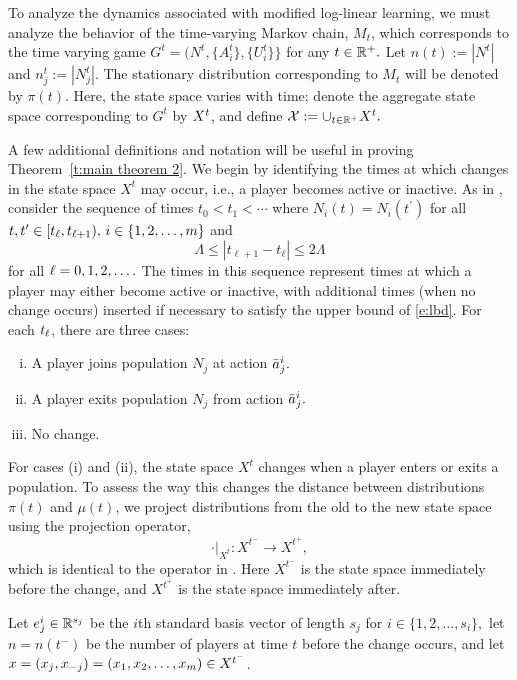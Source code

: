To analyze the dynamics associated with modified log-linear learning, we must analyze the behavior of the time-varying Markov chain, $M_t$, which corresponds to the time varying game $G^t = (N^t,\{A_i^t\},\{U_i^t\}\}$ for any $t\in \mathbb{R}^+.$ Let $n(t):= |N^t|$ and $n_j^t := |N_j^t|.$ The stationary distribution corresponding to $M_t$ will be denoted by $\pi(t).$ Here, the state space varies with time; denote the aggregate state space corresponding to $G^t$ by $X^t$, and define ${\mathcal X}:=\cup_{t\in \mathbb{R}^+} X^t.$ 

A few additional definitions and notation will be useful in proving Theorem~\ref{t:main theorem 2}. 
We begin by identifying the times at which changes in the state space $X^t$ may occur, i.e., a player becomes active or inactive. As in \cite{Shah2010}, consider the sequence of times
 $t_0<t_1<\cdots$
 where $N_i(t) = N_i(t^\prime)$ for all $t,t^\prime\in [t_{\ell},t_{{\ell}+1}),\, i\in \{1,2,\ldots,m\}$ and 
 \begin{equation}\label{e:lbd}
\Lambda \leq |t_{\ell+1} - t_{\ell}|\leq 2\Lambda
\end{equation}
for all ${\ell} = 0,1,2,\ldots.$ The times in this sequence represent times at which a player may either become active or inactive, with additional times (when no change occurs) inserted if necessary to satisfy the upper bound of \eqref{e:lbd}. For each $t_{\ell}$, there are three cases:
\begin{enumerate}[(i)]
\item A player joins population $N_j$ at action $\bar{a}_j^i.$
\item A player exits population $N_j$ from action $\bar{a}_j^i.$
\item No change.
\end{enumerate}
For cases (i) and (ii), the state space $X^t$ changes when a player enters or exits a population. To assess the way this changes the distance between distributions $\pi(t)$ and $\mu(t)$, we project distributions from the old to the new state space using the projection operator, $$\cdot|_{X^t}:X^{t^-}\to X^{t^+},$$ which is identical to the operator in \cite{Shah2010}.  Here $X^{t^-}$ is the state space immediately before the change, and $X^{t^+}$ is the state space immediately after. 


Let $e_j^i\in\mathbb{R}^{s_j}$ be the $i$th standard basis vector of length $s_j$ for $i\in \{1,2,\ldots,s_i\},$   let $n = n(t^-)$ be the number of players at time $t$ before the change occurs, and let $x = (x_{j},x_{{-j}}) = (x_{1},x_{2},\ldots,x_{m})\in X^{t^-} $.

